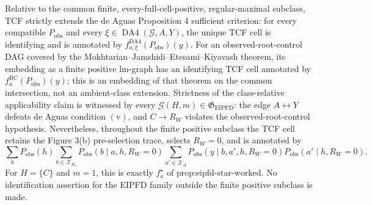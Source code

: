 Relative to the common finite, every-full-cell-positive, regular-maximal subclass, TCF strictly extends the de Aguas Proposition 4 sufficient criterion: for every compatible \(P_{\mathrm{obs}}\) and every \(\xi\in\operatorname{DA4}(\mathcal G,A,Y)\), the unique TCF cell is identifying and is annotated by \(f^{\mathrm{DA4}}_{a,\xi}(P_{\mathrm{obs}})(y)\). For an observed-root-control DAG covered by the Mokhtarian--Jamshidi--Etesami--Kiyavash theorem, its embedding as a finite positive lm-graph has an identifying TCF cell annotated by \(f_a^{\mathrm{RC}}(P_{\mathrm{obs}})(y)\); this is an embedding of that theorem on the common intersection, not an ambient-class extension. Strictness of the class-relative applicability claim is witnessed by every \(\mathcal G(H,m)\in\mathfrak G_{\mathrm{EIPFD}}\): the edge \(A\leftrightarrow Y\) defeats de Aguas condition \(\mathrm{(v)}\), and \(C\to R_W\) violates the observed-root-control hypothesis. Nevertheless, throughout the finite positive subclass the TCF cell retains the Figure 3(b) pre-selection trace, selects \(R_W=0\), and is annotated by
\[
\sum_hP_{\mathrm{obs}}(h)
\sum_{b\in\mathcal X_{B_1}}P_{\mathrm{obs}}(b\mid a,h,R_W=0)
\sum_{a'\in\mathcal X_A}P_{\mathrm{obs}}(y\mid b,a',h,R_W=0)
P_{\mathrm{obs}}(a'\mid h,R_W=0).
\]
For \(H=\{C\}\) and \(m=1\), this is exactly \(f_a^\star\) of \(\text{prop:eipfd-star-worked}\). No identification assertion for the EIPFD family outside the finite positive subclass is made.